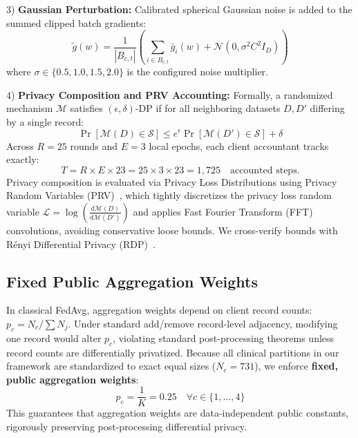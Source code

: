 \documentclass[journal,twocolumn,10pt]{IEEEtran}
\begin{document}
3) \textbf{Gaussian Perturbation:} Calibrated spherical Gaussian noise is added to the summed clipped batch gradients:
\begin{equation}
\tilde{g}(w) = \frac{1}{|B_{c,t}|} \left( \sum_{i \in B_{c,t}} \bar{g}_i(w) + \mathcal{N}(0, \sigma^2 C^2 I_D) \right)
\end{equation}
where $\sigma \in \{0.5, 1.0, 1.5, 2.0\}$ is the configured noise multiplier.

4) \textbf{Privacy Composition and PRV Accounting:} Formally, a randomized mechanism $\mathcal{M}$ satisfies $(\epsilon, \delta)$-DP if for all neighboring datasets $D, D'$ differing by a single record:
\begin{equation}
\Pr[\mathcal{M}(D) \in \mathcal{S}] \le e^\epsilon \Pr[\mathcal{M}(D') \in \mathcal{S}] + \delta
\end{equation}
Across $R = 25$ rounds and $E = 3$ local epochs, each client accountant tracks exactly:
\begin{equation}
T = R \times E \times 23 = 25 \times 3 \times 23 = 1,725 \quad \text{accounted steps.}
\end{equation}
Privacy composition is evaluated via Privacy Loss Distributions using Privacy Random Variables (PRV)~\cite{gopi2021numerical}, which tightly discretizes the privacy loss random variable $\mathcal{L} = \log\left( \frac{d\mathcal{M}(D)}{d\mathcal{M}(D')} \right)$ and applies Fast Fourier Transform (FFT) convolutions, avoiding conservative loose bounds. We cross-verify bounds with R\'enyi Differential Privacy (RDP)~\cite{mironov2017renyi}.

\subsection{Fixed Public Aggregation Weights}
In classical FedAvg, aggregation weights depend on client record counts: $p_c = N_c / \sum N_j$. Under standard add/remove record-level adjacency, modifying one record would alter $p_c$, violating standard post-processing theorems unless record counts are differentially privatized. Because all clinical partitions in our framework are standardized to exact equal sizes ($N_c = 731$), we enforce \textbf{fixed, public aggregation weights}:
\begin{equation}
p_c = \frac{1}{K} = 0.25 \quad \forall c \in \{1, \dots, 4\}
\end{equation}
This guarantees that aggregation weights are data-independent public constants, rigorously preserving post-processing differential privacy.
\end{document}
